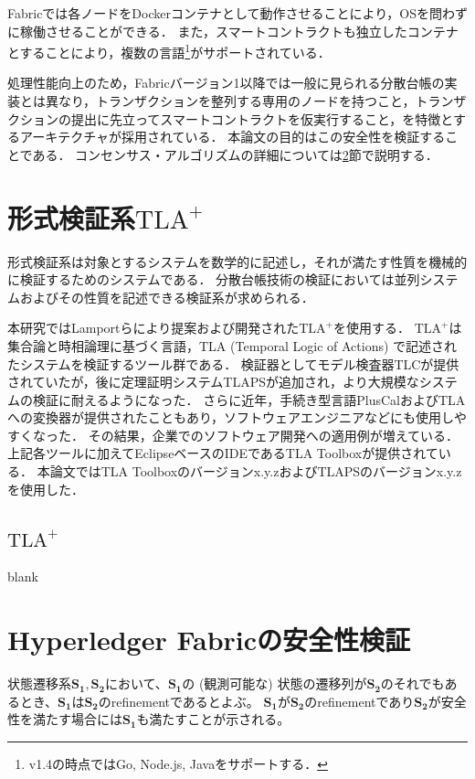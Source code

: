\documentclass{fose2019}           %
\newcommand{\TLA}{$\text{TLA}^{+}$}
\begin{document}
Fabricでは各ノードをDockerコンテナとして動作させることにより，OSを問わずに稼働させることができる．
また，スマートコントラクトも独立したコンテナとすることにより，複数の言語\footnote{v1.4の時点ではGo, Node.js, Javaをサポートする．}がサポートされている．

処理性能向上のため，Fabricバージョン1以降では一般に見られる分散台帳の実装とは異なり，トランザクションを整列する専用のノードを持つこと，トランザクションの提出に先立ってスマートコントラクトを仮実行すること，を特徴とするアーキテクチャが採用されている．
本論文の目的はこの安全性を検証することである．
コンセンサス・アルゴリズムの詳細については\ref{sec:verification}節で説明する．

\section{形式検証系\TLA}
\label{sec:tla}
形式検証系は対象とするシステムを数学的に記述し，それが満たす性質を機械的に検証するためのシステムである．
分散台帳技術の検証においては並列システムおよびその性質を記述できる検証系が求められる．

本研究ではLamportらにより提案および開発された\TLA を使用する．
\TLA は集合論と時相論理に基づく言語，TLA (Temporal Logic of Actions) で記述されたシステムを検証するツール群である．
検証器としてモデル検査器TLCが提供されていたが，後に定理証明システムTLAPSが追加され，より大規模なシステムの検証に耐えるようになった．
さらに近年，手続き型言語PlusCalおよびTLAへの変換器が提供されたこともあり，ソフトウェアエンジニアなどにも使用しやすくなった．
その結果，企業でのソフトウェア開発への適用例が増えている\cite{}．
上記各ツールに加えてEclipseベースのIDEであるTLA Toolboxが提供されている．
本論文ではTLA Toolboxのバージョンx.y.zおよびTLAPSのバージョンx.y.zを使用した．

\subsection{\TLA}

blank

\section{Hyperledger Fabricの安全性検証}
\label{sec:verification}

\newcommand{\s}[1]{\mathbf{S_{#1}}}
\newcommand{\p}[1]{\langle #1 \rangle}
\newcommand{\ra}{\Rightarrow}

状態遷移系$\s1,\s2$において、$\s1$の (観測可能な) 状態の遷移列が$\s2$のそれでもあるとき、$\s1$は$\s2$のrefinementであるとよぶ。
$\s1$が$\s2$のrefinementであり$\s2$が安全性を満たす場合には$\s1$も満たすことが示される。
\end{document}
